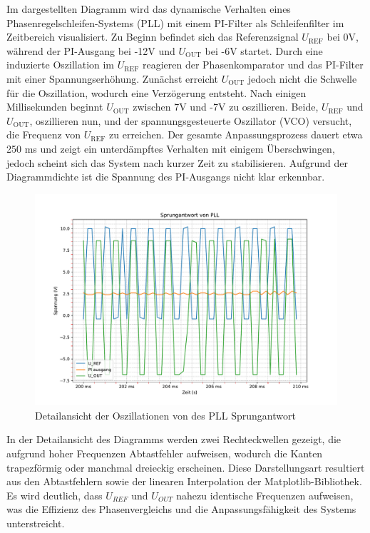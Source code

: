 Im dargestellten Diagramm wird das dynamische Verhalten eines Phasenregelschleifen-Systems (PLL) mit einem PI-Filter als Schleifenfilter im Zeitbereich visualisiert. Zu Beginn befindet sich das Referenzsignal $U_{\text{REF}}$ bei 0V, während der PI-Ausgang bei -12V und $U_{\text{OUT}}$ bei -6V startet. Durch eine induzierte Oszillation im $U_{\text{REF}}$ reagieren der Phasenkomparator und das PI-Filter mit einer Spannungserhöhung. Zunächst erreicht $U_{\text{OUT}}$ jedoch nicht die Schwelle für die Oszillation, wodurch eine Verzögerung entsteht. Nach einigen Millisekunden beginnt $U_{\text{OUT}}$ zwischen 7V und -7V zu oszillieren. Beide, $U_{\text{REF}}$ und $U_{\text{OUT}}$, oszillieren nun, und der spannungsgesteuerte Oszillator (VCO) versucht, die Frequenz von $U_{\text{REF}}$ zu erreichen. Der gesamte Anpassungsprozess dauert etwa 250 ms und zeigt ein unterdämpftes Verhalten mit einigem Überschwingen, jedoch scheint sich das System nach kurzer Zeit zu stabilisieren. Aufgrund der Diagrammdichte ist die Spannung des PI-Ausgangs nicht klar erkennbar.

\begin{figure}[H]
  \centering
  \includegraphics[width=0.8\linewidth]{Elektronik-Laborprotokoll_PLL/Abbildungen/sprungantwort_zoom.pdf}
  \caption{Detailansicht der Oszillationen von des PLL Sprungantwort}
  \label{fig:spa_zoom}
\end{figure}
In der Detailansicht des Diagramms werden zwei Rechteckwellen gezeigt, die aufgrund hoher Frequenzen Abtastfehler aufweisen, wodurch die Kanten trapezförmig oder manchmal dreieckig erscheinen. Diese Darstellungsart resultiert aus den Abtastfehlern sowie der linearen Interpolation der Matplotlib-Bibliothek. Es wird deutlich, dass \(U_{REF}\) und \(U_{OUT}\) nahezu identische Frequenzen aufweisen, was die Effizienz des Phasenvergleichs und die Anpassungsfähigkeit des Systems unterstreicht. 

